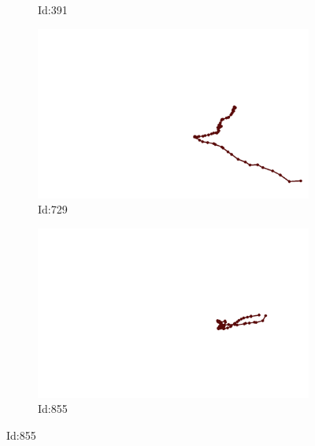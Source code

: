 \documentclass[12pt,twoside]{report}
\begin{document}
\begin{figure}
\begin{subfigure}[b]{0.20\textwidth}
\caption{Id:391}
\end{subfigure}
\begin{subfigure}[b]{0.20\textwidth}
\centering
\includegraphics[width=\textwidth]{../../trajectories/729.png}
\caption{Id:729}
\end{subfigure}
\begin{subfigure}[b]{0.20\textwidth}
\centering
\includegraphics[width=\textwidth]{../../trajectories/855.png}
\caption{Id:855}
\end{subfigure}
\end{figure}
\end{document}
